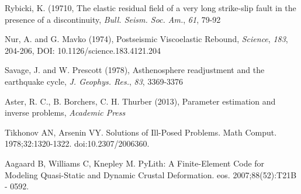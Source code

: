 \documentclass[12pt]{article}
\begin{document}
\begin{thebibliography}{}
 Rybicki, K. (19710, The
  elastic residual field of a very long strike-slip fault in the
  presence of a discontinuity, {\textit{Bull. Seism. Soc. Am.}},
  \textit{61}, 79-92

 Nur, A. and G. Mavko
  (1974), Postseismic Viscoelastic Rebound, {\textit{Science}},
  \textit{183}, 204-206, DOI: 10.1126/science.183.4121.204

 Savage, J. and
  W. Prescott (1978), Asthenosphere readjustment and the earthquake
  cycle, {\it J. Geophys. Res.}, \textit{83}, 3369-3376

 Aster, R. C., B. Borchers,
  C. H. Thurber (2013), Parameter estimation and inverse
  problems, {\textit{Academic Press}}





 Tikhonov AN,
  Arsenin VY. Solutions of Ill-Posed Problems. Math
  Comput. 1978;32:1320-1322. doi:10.2307/2006360.

 Aagaard B, Williams C,
  Knepley M. PyLith: A Finite-Element Code for Modeling Quasi-Static
  and Dynamic Crustal Deformation. eos. 2007;88(52):T21B - 0592.

\end{thebibliography}
\end{document}
